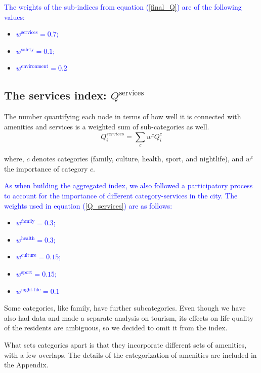 \textcolor{blue}{The weights of the sub-indices from equation (\ref{final_Q}) are of the following values:}

\begin{itemize}
  \item \textcolor{blue}{$w^{\text{services}}=0.7$;}
  \item \textcolor{blue}{$w^{\text{safety}}=0.1$;}
  \item \textcolor{blue}{$w^{\text{environment}}=0.2$}
\end{itemize}

\subsection{The services index: \texorpdfstring{$Q^{\text{services}}$}{Q\^services}}
The number quantifying each node in terms of how well it is connected with amenities and services is a weighted sum of sub-categories as well.
\begin{equation}\label{Q_services}
	Q_i^{services} =\sum_c w^c Q_i^c
\end{equation}

where, $c$ denotes categories (family, culture, health, sport, and nightlife), and $w^c$ the importance of category $c$. %

\textcolor{blue}{As when building the aggregated index, we also followed a participatory process to account for the importance of different category-services in the city. The weights used in equation (\ref{Q_services}) are as follows:}

\begin{itemize}
  \item \textcolor{blue}{$w^{\text{family}}= 0.3$;}
  \item \textcolor{blue}{$w^{\text{health}}= 0.3$;}
  \item \textcolor{blue}{$w^{\text{culture}} = 0.15$;}
  \item \textcolor{blue}{$w^{\text{sport}} = 0.15$;}
  \item \textcolor{blue}{$w^{\text{night life}}=0.1$}
\end{itemize}

Some categories, like family, have further subcategories. Even though we have also had data and made a separate analysis on tourism, its effects on life quality of the residents are ambiguous, so we decided to omit it from the index.

What sets categories apart is that they incorporate different sets of amenities, with a few overlaps. The details of the categorization of amenities are included in the Appendix.

